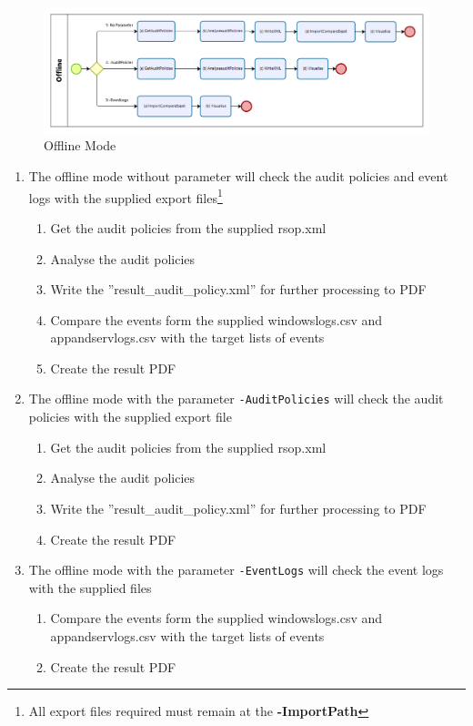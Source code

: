 \begin{figure}[H]
    \centering
    \includegraphics[width=1\linewidth]{assets/modes/offline.png}
    \caption{Offline Mode}
\end{figure}
\begin{enumerate}
    \item The offline mode without parameter will check the audit policies and event logs with the supplied export files\footnote{All export files required must remain at the \textbf{-ImportPath}}
    \begin{enumerate}
        \item Get the audit policies from the supplied rsop.xml
        \item Analyse the audit policies
        \item Write the ''result\_audit\_policy.xml'' for further processing to PDF
        \item Compare the events form the supplied windowslogs.csv and appandservlogs.csv with the target lists of events
        \item Create the result PDF
    \end{enumerate}
    \item The offline mode with the parameter \lstinline|-AuditPolicies| will check the audit policies with the supplied export file
    \begin{enumerate}
        \item Get the audit policies from the supplied rsop.xml
        \item Analyse the audit policies
        \item Write the ''result\_audit\_policy.xml'' for further processing to PDF
        \item Create the result PDF
    \end{enumerate}
    \item The offline mode with the parameter \lstinline|-EventLogs| will check the event logs with the supplied files
    \begin{enumerate}
        \item Compare the events form the supplied windowslogs.csv and appandservlogs.csv with the target lists of events
        \item Create the result PDF
    \end{enumerate}
\end{enumerate}

